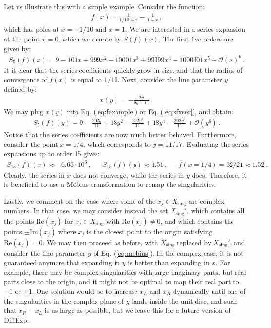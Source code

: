 \documentclass{article}
\begin{document}
Let us illustrate this with a simple example. Consider the function:
\begin{align}
    \label{eq:fexample}
    f(x) = \frac{1}{1/10+x} - \frac{1}{1-x}\,,
\end{align}
which has poles at $x = -1/10$ and $x = 1$. We are interested in a series expansion at the point $x = 0$, which we denote by $S(f)(x)$. The first five orders are given by:
\begin{align}
    \label{eq:sfxser}
    S_5(f)(x) = 9-101 x+999 x^{2}-10001 x^{3}+99999 x^{4}-1000001 x^{5}+\mathcal{O}(x)^{6}\,.
\end{align}
It it clear that the series coefficients quickly grow in size, and that the radius of convergence of $f(x)$ is equal to $1/10$. Next, consider the line parameter $y$ defined by:
\begin{align}
    x(y) = -\frac{2 y}{9y-11}\,,
\end{align}
We may plug $x(y)$ into Eq. (\ref{eq:fexample}) or Eq. (\ref{eq:sfxser}), and obtain:
\begin{align}
    S_5(f)(y) = 9-\frac{202 y}{11}+18 y^{2}-\frac{202 y^{3}}{11}+18 y^{4}-\frac{202 y^{5}}{11}+\mathcal{O}\left(y^{6}\right)\,.
\end{align}
Notice that the series coefficients are now much better behaved. Furthermore, consider the point $x = 1/4$, which corresponds to $y=11/17$. Evaluating the series expansions up to order 15 gives:
\begin{align}
    S_{15}(f)(x) \approx -6.65\cdot 10^{6}\,, && S_{15}(f)(y) \approx 1.51\,, && f(x=1/4) = 32/21 \approx 1.52\,.
\end{align}
Clearly, the series in $x$ does not converge, while the series in $y$ does. Therefore, it is beneficial to use a Möbius transformation to remap the singularities.

Lastly, we comment on the case where some of the $x_j\in X_{\text{sing}}$ are complex numbers. In that case, we may consider instead the set $X_\text{sing}'$, which contains all the points $\text{Re}(x_j)$ for $x_j \in X_{\text{sing}}$ with $\text{Re}(x_j)\neq 0$, and which contains the points $\pm \text{Im}(x_j)$  where $x_j$ is the closest point to the origin satisfying $\text{Re}(x_j) = 0$. We may then proceed as before, with $X_{\text{sing}}$ replaced by $X_{\text{sing}}'$, and consider the line parameter $y$ of Eq. (\ref{eq:mobius}). In the complex case, it is not guaranteed anymore that expanding in $y$ is better than expanding in $x$. For example, there may be complex singularities with large imaginary parts, but real parts close to the origin, and it might not be optimal to map their real part to $-1$ or $+1$. One solution would be to increase $x_L$ and $x_R$ dynamically until one of the singularities in the complex plane of $y$ lands inside the unit disc, and such that $x_R - x_L$ is as large as possible, but we leave this for a future version of DiffExp.
\end{document}

